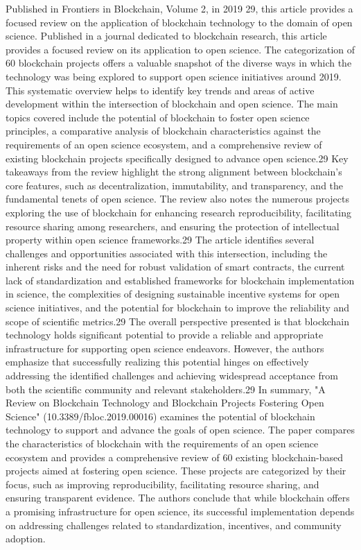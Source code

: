 \documentclass{article}
\begin{document}
Published in Frontiers in Blockchain, Volume 2, in 2019 29, this article provides a focused review on the application of blockchain technology to the domain of open science. Published in a journal dedicated to blockchain research, this article provides a focused review on its application to open science. The categorization of 60 blockchain projects offers a valuable snapshot of the diverse ways in which the technology was being explored to support open science initiatives around 2019. This systematic overview helps to identify key trends and areas of active development within the intersection of blockchain and open science. The main topics covered include the potential of blockchain to foster open science principles, a comparative analysis of blockchain characteristics against the requirements of an open science ecosystem, and a comprehensive review of existing blockchain projects specifically designed to advance open science.29 Key takeaways from the review highlight the strong alignment between blockchain's core features, such as decentralization, immutability, and transparency, and the fundamental tenets of open science. The review also notes the numerous projects exploring the use of blockchain for enhancing research reproducibility, facilitating resource sharing among researchers, and ensuring the protection of intellectual property within open science frameworks.29 The article identifies several challenges and opportunities associated with this intersection, including the inherent risks and the need for robust validation of smart contracts, the current lack of standardization and established frameworks for blockchain implementation in science, the complexities of designing sustainable incentive systems for open science initiatives, and the potential for blockchain to improve the reliability and scope of scientific metrics.29 The overall perspective presented is that blockchain technology holds significant potential to provide a reliable and appropriate infrastructure for supporting open science endeavors. However, the authors emphasize that successfully realizing this potential hinges on effectively addressing the identified challenges and achieving widespread acceptance from both the scientific community and relevant stakeholders.29
In summary, "A Review on Blockchain Technology and Blockchain Projects Fostering Open Science" (10.3389/fbloc.2019.00016) examines the potential of blockchain technology to support and advance the goals of open science. The paper compares the characteristics of blockchain with the requirements of an open science ecosystem and provides a comprehensive review of 60 existing blockchain-based projects aimed at fostering open science. These projects are categorized by their focus, such as improving reproducibility, facilitating resource sharing, and ensuring transparent evidence. The authors conclude that while blockchain offers a promising infrastructure for open science, its successful implementation depends on addressing challenges related to standardization, incentives, and community adoption.
\end{document}
